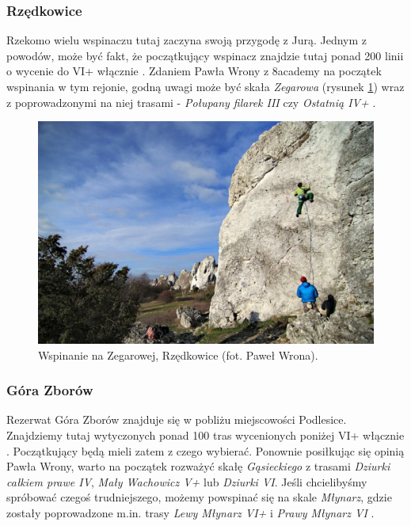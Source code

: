 \documentclass{article}
\begin{document}
\subsubsection{Rzędkowice}
Rzekomo wielu wspinaczu tutaj zaczyna swoją przygodę z Jurą. Jednym z powodów, może być fakt, że początkujący wspinacz znajdzie tutaj ponad 200 linii o wycenie do VI+ włącznie \cite{jura-rzedkowice}. Zdaniem Pawła Wrony z 8academy na początek wspinania w tym rejonie, godną uwagi może być skała \textit{Zegarowa} (rysunek \ref{zegarowa}) wraz z poprowadzonymi na niej trasami - \textit{Połupany filarek III} czy \textit{Ostatnią IV+} \cite{jura-rzedkowice}.

\begin{figure}[!htbp]
	\begin{center}
		\includegraphics[width=0.75\linewidth]{images/jura-zegarowa.eps}
	\end{center}
	\caption{Wspinanie na Zegarowej, Rzędkowice (fot. Paweł Wrona)\cite{jura-rzedkowice}.}
	\label{zegarowa}
\end{figure}

\subsubsection{Góra Zborów}
Rezerwat Góra Zborów znajduje się w pobliżu miejscowości Podlesice. Znajdziemy tutaj wytyczonych ponad 100 tras wycenionych poniżej VI+ włącznie \cite{topo-gora-zborow}. Początkujący będą mieli zatem z czego wybierać. Ponownie posiłkując się opinią Pawła Wrony, warto na początek rozważyć skałę \textit{Gąsieckiego} z trasami \textit{Dziurki całkiem prawe IV}, \textit{Mały Wachowicz V+} lub \textit{Dziurki VI}. Jeśli chcielibyśmy spróbować czegoś trudniejszego, możemy powspinać się na skale \textit{Młynarz}, gdzie zostały poprowadzone m.in. trasy \textit{Lewy Młynarz VI+} i \textit{Prawy Młynarz VI} \cite{jura-gora-zborow}.
\end{document}
